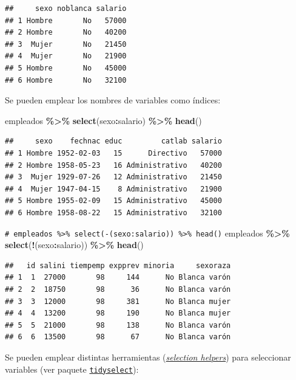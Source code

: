 \documentclass[
]{book}
\newenvironment{Shaded}{\begin{snugshade}}{\end{snugshade}}
\newcommand{\CommentTok}[1]{\textcolor[rgb]{0.56,0.35,0.01}{\textit{#1}}}
\newcommand{\FunctionTok}[1]{\textcolor[rgb]{0.13,0.29,0.53}{\textbf{#1}}}
\newcommand{\NormalTok}[1]{#1}
\newcommand{\SpecialCharTok}[1]{\textcolor[rgb]{0.81,0.36,0.00}{\textbf{#1}}}
\theoremstyle{break}
\theoremstyle{nonumberplain}
\renewcommand{\CommentTok}[1]{\textcolor[rgb]{0.41,0.41,0.41}{\texttt{#1}}}
\begin{document}
\begin{verbatim}
##     sexo noblanca salario
## 1 Hombre       No   57000
## 2 Hombre       No   40200
## 3  Mujer       No   21450
## 4  Mujer       No   21900
## 5 Hombre       No   45000
## 6 Hombre       No   32100
\end{verbatim}

Se pueden emplear los nombres de variables como índices:

\begin{Shaded}
\begin{Highlighting}[]
\NormalTok{empleados }\SpecialCharTok{\%\textgreater{}\%} \FunctionTok{select}\NormalTok{(sexo}\SpecialCharTok{:}\NormalTok{salario) }\SpecialCharTok{\%\textgreater{}\%} \FunctionTok{head}\NormalTok{()}
\end{Highlighting}
\end{Shaded}

\begin{verbatim}
##     sexo    fechnac educ         catlab salario
## 1 Hombre 1952-02-03   15      Directivo   57000
## 2 Hombre 1958-05-23   16 Administrativo   40200
## 3  Mujer 1929-07-26   12 Administrativo   21450
## 4  Mujer 1947-04-15    8 Administrativo   21900
## 5 Hombre 1955-02-09   15 Administrativo   45000
## 6 Hombre 1958-08-22   15 Administrativo   32100
\end{verbatim}

\begin{Shaded}
\begin{Highlighting}[]
\CommentTok{\# empleados \%\textgreater{}\% select({-}(sexo:salario)) \%\textgreater{}\% head()}
\NormalTok{empleados }\SpecialCharTok{\%\textgreater{}\%} \FunctionTok{select}\NormalTok{(}\SpecialCharTok{!}\NormalTok{(sexo}\SpecialCharTok{:}\NormalTok{salario)) }\SpecialCharTok{\%\textgreater{}\%} \FunctionTok{head}\NormalTok{()}
\end{Highlighting}
\end{Shaded}

\begin{verbatim}
##   id salini tiempemp expprev minoria     sexoraza
## 1  1  27000       98     144      No Blanca varón
## 2  2  18750       98      36      No Blanca varón
## 3  3  12000       98     381      No Blanca mujer
## 4  4  13200       98     190      No Blanca mujer
## 5  5  21000       98     138      No Blanca varón
## 6  6  13500       98      67      No Blanca varón
\end{verbatim}

Se pueden emplear distintas herramientas (\emph{\href{https://tidyselect.r-lib.org/reference/language.html}{selection helpers}}) para seleccionar variables (ver paquete \href{https://tidyselect.r-lib.org}{\texttt{tidyselect}}):
\end{document}
